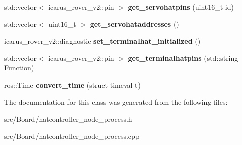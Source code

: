 \begin{DoxyCompactItemize}
std\+::vector$<$ icarus\+\_\+rover\+\_\+v2\+::pin $>$ {\bfseries get\+\_\+servohatpins} (uint16\+\_\+t id)
\item 
\mbox{\label{classHatControllerNodeProcess_aa46ec5f71db4b4f56b931b9690b6fd72}} 
std\+::vector$<$ uint16\+\_\+t $>$ {\bfseries get\+\_\+servohataddresses} ()
\item 
\mbox{\label{classHatControllerNodeProcess_a1758e37e3a5f34b9894146552e4df41b}} 
icarus\+\_\+rover\+\_\+v2\+::diagnostic {\bfseries set\+\_\+terminalhat\+\_\+initialized} ()
\item 
\mbox{\label{classHatControllerNodeProcess_a43f01a964f11a36e52a06b05e0e8e625}} 
std\+::vector$<$ icarus\+\_\+rover\+\_\+v2\+::pin $>$ {\bfseries get\+\_\+terminalhatpins} (std\+::string Function)
\item 
\mbox{\label{classHatControllerNodeProcess_a74fbd32d6d67bfb2c0d95dc3da92bcab}} 
ros\+::\+Time {\bfseries convert\+\_\+time} (struct timeval t)
\end{DoxyCompactItemize}


The documentation for this class was generated from the following files\+:\begin{DoxyCompactItemize}
\item 
src/\+Board/hatcontroller\+\_\+node\+\_\+process.\+h\item 
src/\+Board/hatcontroller\+\_\+node\+\_\+process.\+cpp\end{DoxyCompactItemize}
